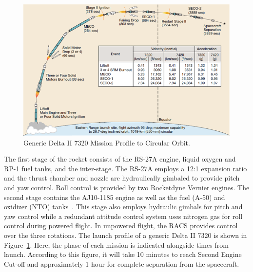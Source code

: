 \documentclass[paper=letter, fontsize=11pt]{scrartcl} %
\numberwithin{equation}{section} %
\numberwithin{figure}{section} %
\numberwithin{table}{section} %
\begin{document}
\begin{figure}[H]
\centering
\includegraphics[width=.75\textwidth]{12-2.png}
\caption{Generic Delta II 7320 Mission Profile to Circular Orbit.}
\label{L2}
\end{figure}

The first stage of the rocket consists of the RS-27A engine, liquid oxygen and RP-1 fuel tanks, and the inter-stage. The RS-27A employs a 12:1 expansion ratio and the thrust chamber and nozzle are hydraulically gimbaled to provide pitch and yaw control. Roll control is provided by two Rocketdyne Vernier engines. The second stage contains the AJ10-1185 engine as well as the fuel (A-50) and oxidizer (NTO) tanks~\cite{ref12_14}. This stage also employs hydraulic gimbals for pitch and yaw control while a redundant attitude control system uses nitrogen gas for roll control during powered flight. In unpowered flight, the RACS provides control over the three rotations. The launch profile of a generic Delta II 7320 is shown in Figure~\ref{L2}. Here, the phase of each mission is indicated alongside times from launch. According to this figure, it will take 10 minutes to reach Second Engine Cut-off and approximately 1 hour for complete separation from the spacecraft.
\end{document}
